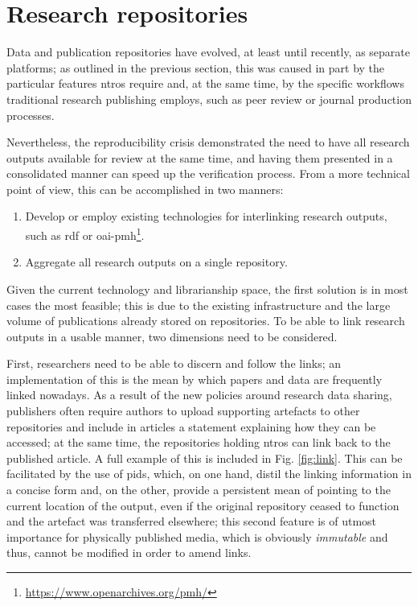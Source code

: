 \section{Research repositories}
\label{sec:research}

Data and publication repositories have evolved, at least until recently, as separate platforms; as outlined in the previous section, this was caused in part by the particular features \glspl{ntro} require and, at the same time, by the specific workflows traditional research publishing employs, such as peer review or journal production processes.

Nevertheless, the reproducibility crisis demonstrated the need to have all research outputs available for review at the same time, and having them presented in a consolidated manner can speed up the verification process. From a more technical point of view, this can be accomplished in two manners:
\begin{enumerate}
    \item Develop or employ existing technologies for interlinking research outputs, such as \gls{rdf} or \gls{oai}-\gls{pmh}\footnote{\url{https://www.openarchives.org/pmh/}}.
    \item Aggregate all research outputs on a single repository.
\end{enumerate}

Given the current technology and librarianship space, the first solution is in most cases the most feasible; this is due to the existing infrastructure and the large volume of publications already stored on repositories. To be able to link research outputs in a usable manner, two dimensions need to be considered.

First, researchers need to be able to discern and follow the links; an implementation of this is the mean by which papers and data are frequently linked nowadays. As a result of the new policies around research data sharing, publishers often require authors to upload supporting artefacts to other repositories\cite{elsdat,scidat} and include in articles a statement explaining how they can be accessed; at the same time, the repositories holding \glspl{ntro} can link back to the published article. A full example of this is included in Fig. \ref{fig:link}. This can be facilitated by the use of \glspl{pid}, which, on one hand, distil the linking information in a concise form and, on the other, provide a persistent mean of pointing to the current location of the output, even if the original repository ceased to function and the artefact was transferred elsewhere; this second feature is of utmost importance for physically published media, which is obviously \emph{immutable} and thus, cannot be modified in order to amend links.


